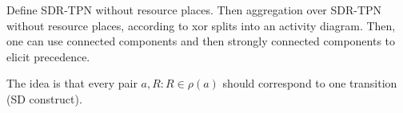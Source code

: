\documentclass[11pt]{article}
\newcommand{\todo}[1]{\textcolor{red}{\bf {#1}}}
\newtheorem{mydef}{Definition}
\begin{document}
Define SDR-TPN without resource places. Then aggregation over SDR-TPN without resource places, 
according to xor splits into an activity diagram. Then, one can use connected components and then strongly
connected components to elicit precedence. 




The idea is that every pair $a, R: R \in \rho(a)$ 
should correspond to one transition (SD construct). 













%
%
%
\end{document}
